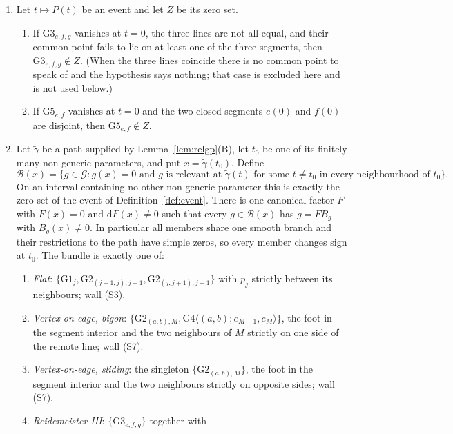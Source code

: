 \begin{lemma}\label{lem:dictionary}
\begin{enumerate}
\item[(A)] Let $t\mapsto P(t)$ be an event and let $Z$ be its zero set.
\begin{enumerate}
\item[(a)] If $\mathrm{G3}_{e,f,g}$ vanishes at $t=0$, the three lines are not
all equal, and their common point fails to lie on at least one of the three
segments, then $\mathrm{G3}_{e,f,g}\notin Z$. (When the three lines coincide
there is no common point to speak of and the hypothesis says nothing; that case
is excluded here and is not used below.)
\item[(b)] If $\mathrm{G5}_{e,f}$ vanishes at $t=0$ and the two closed segments
$e(0)$ and $f(0)$ are disjoint, then $\mathrm{G5}_{e,f}\notin Z$.
\end{enumerate}
\item[(B)] Let $\tilde\gamma$ be a path supplied by Lemma~\ref{lem:relgp}(B), let $t_0$ be
one of its finitely many non-generic parameters, and put
$x=\tilde\gamma(t_0)$. Define
\[
 \mathcal B(x)=\{g\in\mathcal G:g(x)=0\text{ and }g\text{ is relevant at }
 \tilde\gamma(t)\text{ for some }t\neq t_0\text{ in every neighbourhood of }t_0\}.
\]
On an interval containing no other non-generic parameter this is exactly the
zero set of the event of Definition~\ref{def:event}. There is one canonical
factor $F$ with $F(x)=0$ and $\mathrm dF(x)\neq0$ such that every
$g\in\mathcal B(x)$ has $g=F B_g$ with $B_g(x)\neq0$. In particular all
members share one smooth branch and their restrictions to the path have simple
zeros, so every member changes sign at $t_0$. The bundle is exactly one of:
\begin{enumerate}
\item[(i)] \emph{Flat}: $\{\mathrm{G1}_j,
\mathrm{G2}_{(j-1,j),j+1},\mathrm{G2}_{(j,j+1),j-1}\}$ with $p_j$ strictly
between its neighbours; wall (S3).
\item[(ii)] \emph{Vertex-on-edge, bigon}:
$\{\mathrm{G2}_{(a,b),M},\mathrm{G4}\langle(a,b);e_{M-1},e_M\rangle\}$,
the foot in the segment interior and the two neighbours of $M$ strictly on one
side of the remote line; wall (S7).
\item[(iii)] \emph{Vertex-on-edge, sliding}: the singleton
$\{\mathrm{G2}_{(a,b),M}\}$, the foot in the segment interior and the two
neighbours strictly on opposite sides; wall (S7).
\item[(iv)] \emph{Reidemeister III}: $\{\mathrm{G3}_{e,f,g}\}$ together with

\end{enumerate}
\end{enumerate}
\end{lemma}
